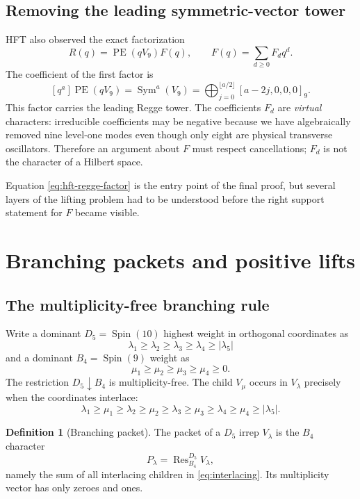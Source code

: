 \documentclass[11pt,a4paper]{article}
\theoremstyle{definition}
\newtheorem{definition}[theorem]{Definition}
\newcommand{\Spin}{\operatorname{Spin}}
\newcommand{\PE}{\operatorname{PE}}
\newcommand{\Res}{\operatorname{Res}}
\begin{document}
\subsection{Removing the leading symmetric-vector tower}

HFT also observed the exact factorization
\begin{equation}
\label{eq:hft-regge-factor}
   R(q)=\PE(qV_9)F(q),
   \qquad
   F(q)=\sum_{d\geq0}F_dq^d.
\end{equation}
The coefficient of the first factor is
\[
   [q^a]\PE(qV_9)
   =\operatorname{Sym}^{a}(V_9)
   =\bigoplus_{j=0}^{\lfloor a/2\rfloor}[a-2j,0,0,0]_9.
\]
This factor carries the leading Regge tower.  The coefficients $F_d$ are
\emph{virtual} characters: irreducible coefficients may be negative because
we have algebraically removed nine level-one modes even though only eight are
physical transverse oscillators.  Therefore an argument about $F$ must
respect cancellations; $F_d$ is not the character of a Hilbert space.

Equation \eqref{eq:hft-regge-factor} is the entry point of the final proof,
but several layers of the lifting problem had to be understood before the
right support statement for $F$ became visible.

\section{Branching packets and positive lifts}

\subsection{The multiplicity-free branching rule}

Write a dominant $D_5=\Spin(10)$ highest weight in orthogonal coordinates as
\[
   \lambda_1\geq\lambda_2\geq\lambda_3\geq\lambda_4
   \geq|\lambda_5|
\]
and a dominant $B_4=\Spin(9)$ weight as
\[
   \mu_1\geq\mu_2\geq\mu_3\geq\mu_4\geq0.
\]
The restriction $D_5\downarrow B_4$ is multiplicity-free.  The child
$V_\mu$ occurs in $V_\lambda$ precisely when the coordinates interlace:
\begin{equation}
\label{eq:interlacing}
 \lambda_1\geq\mu_1\geq\lambda_2\geq\mu_2
 \geq\lambda_3\geq\mu_3\geq\lambda_4
 \geq\mu_4\geq|\lambda_5|.
\end{equation}

\begin{definition}[Branching packet]
The packet of a $D_5$ irrep $V_\lambda$ is the $B_4$ character
\[
   P_\lambda=\Res^{D_5}_{B_4}V_\lambda,
\]
namely the sum of all interlacing children in
\eqref{eq:interlacing}.  Its multiplicity vector has only zeroes and ones.
\end{definition}
\end{document}
